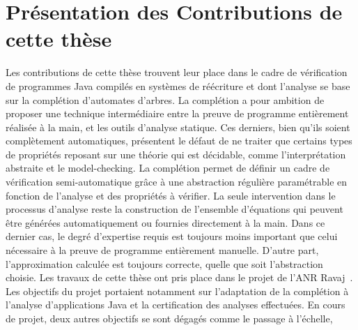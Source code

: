 \section{Présentation des Contributions de cette thèse}
Les contributions de cette thèse trouvent leur place dans le cadre de vérification de programmes Java
compilés en systèmes de réécriture et dont l'analyse se base sur la complétion d'automates d'arbres.
La complétion a pour ambition de proposer une technique intermédiaire entre la preuve de programme
entièrement réalisée à la main, et les outils d'analyse statique.
Ces derniers, bien qu'ils soient complètement automatiques, présentent le défaut de ne traiter que 
certains types de propriétés reposant sur une théorie qui est décidable, comme l'interprétation abstraite et le model-checking.
La complétion permet de définir un cadre de vérification semi-automatique grâce à une abstraction
régulière paramétrable en fonction de l'analyse et des propriétés à vérifier.
La seule intervention dans le processus d'analyse reste la construction de l'ensemble d'équations
qui peuvent être générées automatiquement ou fournies directement à la main. Dans ce dernier cas, 
le degré d'expertise requis est toujours moins important que celui nécessaire à la preuve de programme
entièrement manuelle. D'autre part, l'approximation calculée est toujours correcte, quelle que soit l'abstraction choisie.
Les travaux de cette thèse ont pris place dans le projet de l'ANR Ravaj~\cite{RAVAJ}.
Les objectifs du projet portaient notamment sur l'adaptation de la complétion à l'analyse d'applications Java
et la certification des analyses effectuées. 
En cours de projet, deux autres objectifs se sont dégagés comme le passage à l'échelle,
